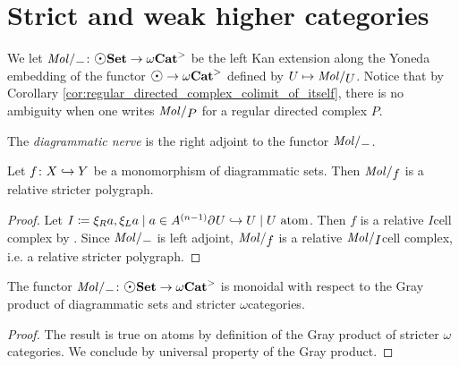 \section{Strict and weak higher categories}

We let \( \molecin{-} \colon \dgmSet \to \somegaCat \) be the left Kan extension along the Yoneda embedding of the functor \( \atom \to \somegaCat \) defined by \( U \mapsto \molecin{U} \).
Notice that by Corollary \ref{cor:regular_directed_complex_colimit_of_itself}, there is no ambiguity when one writes \( \molecin{P} \) for a regular directed complex \( P \).

\begin{dfn} 
    The \emph{diagrammatic nerve} is the right adjoint to the functor \( \molecin{-} \).
\end{dfn}


\begin{lem} \label{lem:molecin_preserves_cofibration}
    Let \( f \colon X \hookrightarrow Y \) be a monomorphism of diagrammatic sets.
    Then \( \molecin{f} \) is a relative stricter polygraph.
\end{lem}
\begin{proof}
    Let \( I \eqdef \set{\bd{}{} U \incl U \mid U \text{ atom}} \).
    Then \( f \) is a relative \( I \)\nbd cell complex by \cite[Remark 2.9]{chanavat2024htpy}.
    Since \( \molecin{-} \) is left adjoint, \( \molecin{f} \) is a relative \( \molecin{I} \)\nbd cell complex, i.e. a relative stricter polygraph.
\end{proof}

\begin{lem} \label{lem:molecin_monoidal}
    The functor \( \molecin{-} \colon \dgmSet \to \somegaCat \) is monoidal with respect to the Gray product of diagrammatic sets and stricter \( \omega \)\nbd categories.
\end{lem}
\begin{proof}
    The result is true on atoms by definition of the Gray product of stricter \( \omega \)\nbd categories.
    We conclude by universal property of the Gray product.
\end{proof}

